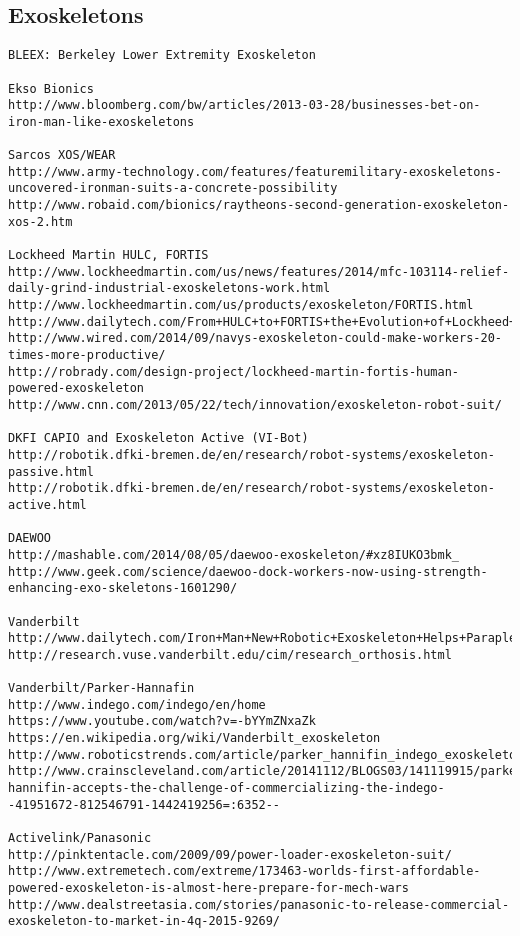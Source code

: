 \documentclass[letterpaper,12pt,fullpage]{article}
\begin{document}
\subsection{Exoskeletons}

\begin{verbatim}
BLEEX: Berkeley Lower Extremity Exoskeleton

Ekso Bionics
http://www.bloomberg.com/bw/articles/2013-03-28/businesses-bet-on-iron-man-like-exoskeletons

Sarcos XOS/WEAR
http://www.army-technology.com/features/featuremilitary-exoskeletons-uncovered-ironman-suits-a-concrete-possibility
http://www.robaid.com/bionics/raytheons-second-generation-exoskeleton-xos-2.htm

Lockheed Martin HULC, FORTIS
http://www.lockheedmartin.com/us/news/features/2014/mfc-103114-relief-daily-grind-industrial-exoskeletons-work.html
http://www.lockheedmartin.com/us/products/exoskeleton/FORTIS.html
http://www.dailytech.com/From+HULC+to+FORTIS+the+Evolution+of+Lockheed+Martins+Incredible+Exosuit/article36421.htm
http://www.wired.com/2014/09/navys-exoskeleton-could-make-workers-20-times-more-productive/
http://robrady.com/design-project/lockheed-martin-fortis-human-powered-exoskeleton
http://www.cnn.com/2013/05/22/tech/innovation/exoskeleton-robot-suit/

DKFI CAPIO and Exoskeleton Active (VI-Bot)
http://robotik.dfki-bremen.de/en/research/robot-systems/exoskeleton-passive.html
http://robotik.dfki-bremen.de/en/research/robot-systems/exoskeleton-active.html

DAEWOO
http://mashable.com/2014/08/05/daewoo-exoskeleton/#xz8IUKO3bmk_
http://www.geek.com/science/daewoo-dock-workers-now-using-strength-enhancing-exo-skeletons-1601290/

Vanderbilt
http://www.dailytech.com/Iron+Man+New+Robotic+Exoskeleton+Helps+Paraplegics+Walk/article29079.htm
http://research.vuse.vanderbilt.edu/cim/research_orthosis.html

Vanderbilt/Parker-Hannafin
http://www.indego.com/indego/en/home
https://www.youtube.com/watch?v=-bYYmZNxaZk
https://en.wikipedia.org/wiki/Vanderbilt_exoskeleton
http://www.roboticstrends.com/article/parker_hannifin_indego_exoskeleton
http://www.crainscleveland.com/article/20141112/BLOGS03/141119915/parker-hannifin-accepts-the-challenge-of-commercializing-the-indego--41951672-812546791-1442419256=:6352--

Activelink/Panasonic
http://pinktentacle.com/2009/09/power-loader-exoskeleton-suit/
http://www.extremetech.com/extreme/173463-worlds-first-affordable-powered-exoskeleton-is-almost-here-prepare-for-mech-wars
http://www.dealstreetasia.com/stories/panasonic-to-release-commercial-exoskeleton-to-market-in-4q-2015-9269/


\end{verbatim}
\end{document}
